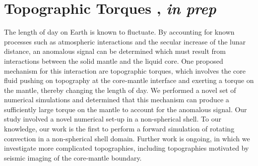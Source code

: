 \documentclass{article}
\begin{document}
\section{Topographic Torques \cite{tO25}, \textit{in prep}}
The length of day on Earth is known to fluctuate. By accounting for known processes such as atmospheric interactions and the secular increase of the lunar distance, an anomalous signal can be determined which must result from interactions between the solid mantle and the liquid core. One proposed mechanism for this interaction are topographic torques, which involves the core fluid pushing on topography at the core-mantle interface and exerting a torque on the mantle, thereby changing the length of day. We performed a novel set of numerical simulations and determined that this mechanism can produce a sufficiently large torque on the mantle to account for the anomalous signal. Our study involved a novel numerical set-up in a non-spherical shell. To our knowledge, our work is the first to perform a forward simulation of rotating convection in a non-spherical shell domain. Further work is ongoing, in which we investigate more complicated topographies, including topographies motivated by seismic imaging of the core-mantle boundary.
\printbibliography
\end{document}
